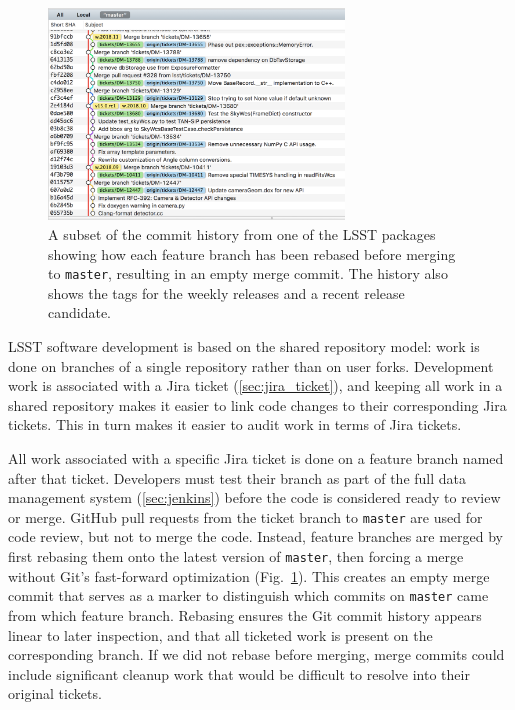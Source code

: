 \begin{figure}[t]
\begin{center}
  \includegraphics[width=0.7\textwidth]{git-history}
\end{center}
\caption{A subset of the commit history from one of the LSST packages showing how each feature branch has been rebased before merging to \texttt{master}, resulting in an empty merge commit.
The history also shows the tags for the weekly releases and a recent release candidate.
\label{fig:commitlog}
}
\end{figure}

LSST software development is based on the shared repository model: work is done on branches of a single repository rather than on user forks.
Development work is associated with a Jira ticket (\autoref{sec:jira_ticket}), and keeping all work in a shared repository makes it easier to link code changes to their corresponding Jira tickets.
This in turn makes it easier to audit work in terms of Jira tickets.

All work associated with a specific Jira ticket is done on a feature branch named after that ticket.
Developers must test their branch as part of the full data management system (\autoref{sec:jenkins}) before the code is considered ready to review or merge.
GitHub pull requests from the ticket branch to \texttt{master} are used for code review, but not to merge the code.
Instead, feature branches are merged by first rebasing them onto the latest version of \texttt{master}, then forcing a merge without Git's fast-forward optimization (Fig.~\ref{fig:commitlog}).
This creates an empty merge commit that serves as a marker to distinguish which commits on \texttt{master} came from which feature branch.
Rebasing ensures the Git commit history appears linear to later inspection, and that all ticketed work is present on the corresponding branch.
If we did not rebase before merging, merge commits could include significant cleanup work that would be difficult to resolve into their original tickets.

